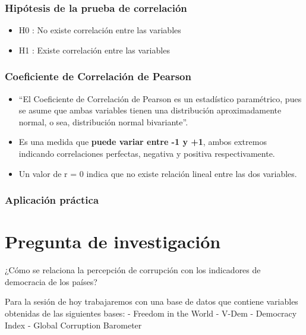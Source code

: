 \documentclass[
]{article}
\providecommand{\tightlist}{%
  \setlength{\itemsep}{0pt}\setlength{\parskip}{0pt}}
\begin{document}
\hypertarget{hipuxf3tesis-de-la-prueba-de-correlaciuxf3n}{%
\subsubsection{Hipótesis de la prueba de
correlación}\label{hipuxf3tesis-de-la-prueba-de-correlaciuxf3n}}

\begin{itemize}
\tightlist
\item
  H0 : No existe correlación entre las variables
\item
  H1 : Existe correlación entre las variables
\end{itemize}

\hypertarget{coeficiente-de-correlaciuxf3n-de-pearson}{%
\subsubsection{Coeficiente de Correlación de
Pearson}\label{coeficiente-de-correlaciuxf3n-de-pearson}}

\begin{itemize}
\item
  ``El Coeficiente de Correlación de Pearson es un estadístico
  paramétrico, pues se asume que ambas variables tienen una distribución
  aproximadamente normal, o sea, distribución normal bivariante''.
\item
  Es una medida que \textbf{puede variar entre -1 y +1}, ambos extremos
  indicando correlaciones perfectas, negativa y positiva
  respectivamente.
\item
  Un valor de r = 0 indica que no existe relación lineal entre las dos
  variables.
\end{itemize}

\hypertarget{aplicaciuxf3n-pruxe1ctica}{%
\subsubsection{Aplicación práctica}\label{aplicaciuxf3n-pruxe1ctica}}

\hypertarget{pregunta-de-investigaciuxf3n}{%
\section{Pregunta de investigación}\label{pregunta-de-investigaciuxf3n}}

¿Cómo se relaciona la percepción de corrupción con los indicadores de
democracia de los países? 🤔

Para la sesión de hoy trabajaremos con una base de datos que contiene
variables obtenidas de las siguientes bases: - Freedom in the World -
V-Dem - Democracy Index - Global Corruption Barometer
\end{document}

